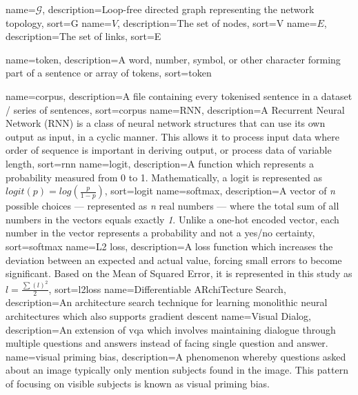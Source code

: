 {
    name=\(\mathcal{G}\),
    description={Loop-free directed graph representing the network topology},
    sort=G
}
{
    name=\(V\),
    description={The set of nodes},
    sort=V
}
{
    name=\(E\),
    description={The set of links},
    sort=E
}

{
    name=token,
    description={A word, number, symbol, or other character forming part of a sentence or array of tokens},
    sort=token
}

{
    name=corpus,
    description={A file containing every tokenised sentence in a dataset / series of sentences},
    sort=corpus
}
{
    name={RNN},
    description={A Recurrent Neural Network (RNN) is a class of neural network structures that
            can use its own output as input, in a cyclic manner. This allows it to process input data where order of sequence is important in deriving output, or process data of variable length},
    sort=rnn
}
{
    name={logit},
    description={A function which represents a probability measured from 0 to 1. Mathematically, a logit is represented as \(logit(p)=log(\frac{p}{1-p})\)},
    sort=logit
}
{
    name={softmax},
    description={A vector of \textit{n} possible choices --- represented as \textit{n} real numbers --- where the total sum of all numbers in the vectors equals exactly \textit{1}. Unlike a one-hot encoded vector, each number in the vector represents a probability and not a yes/no certainty},
    sort=softmax
}
{
    name={L2 loss},
    description={A loss function which increases the deviation between an expected and actual value, forcing small errors to become significant. Based on the Mean of Squared Error, it is represented in this study as \(l=\frac{\sum(l)^2}{2}\)},
    sort=l2loss
}
{
    name={Differentiable ARchiTecture Search},
    description={An architecture search technique for learning monolithic neural architectures which also supports gradient descent}
}
{
    name={Visual Dialog},
    description={An extension of \gls{vqa} which involves maintaining dialogue through multiple questions and answers instead of facing single question and answer. }
}
{
    name={visual priming bias},
    description={A phenomenon whereby questions asked about an image typically only mention subjects found in the image. This pattern of focusing on visible subjects is known as visual priming bias.}
}
